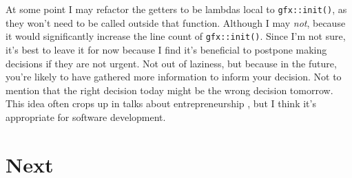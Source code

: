 \documentclass[11pt, a4paper, twocolumn]{article}
\begin{document}
At some point I may refactor the getters to be lambdas local to \verb|gfx::init()|, as they won't need to be called outside that function. Although I may \emph{not}, because it would significantly increase the line count of \verb|gfx::init()|. Since I'm not sure, it's best to leave it for now because I find it's beneficial to postpone making decisions if they are not urgent. Not out of laziness, but because in the future, you're likely to have gathered more information to inform your decision. Not to mention that the right decision today might be the wrong decision tomorrow. This idea often crops up in talks about entrepreneurship \citep{Knott-Craig2017}, but I think it's appropriate for software development.

\section{Next}






\end{document}
